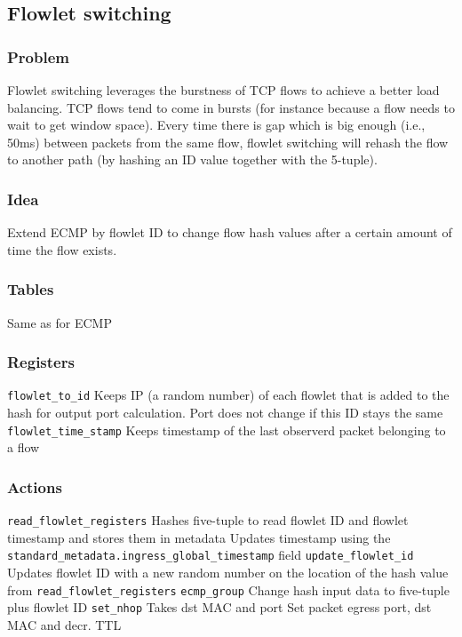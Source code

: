 \documentclass[a4paper, fontsize=8pt, landscape, DIV=1]{scrartcl}
\begin{document}
\begin{multicols*}{4}
  \subsection{Flowlet switching}
  \subsubsection{Problem} Flowlet switching leverages the burstness of TCP flows to achieve a better load balancing. 
  TCP flows tend to come in bursts (for instance because
  a flow needs to wait to get window space). Every time there is gap which is big enough (i.e., 50ms) 
  between packets from the same flow, flowlet switching
  will rehash the flow to another path (by hashing an ID value together with the 5-tuple).

  \subsubsection{Idea} Extend ECMP by flowlet ID to change flow hash values after
  a certain amount of time the flow exists.

  \subsubsection{Tables} 
  Same as for ECMP

  \subsubsection{Registers}
  \begin{outline}
  \1 \texttt{flowlet\_to\_id}
    \2 Keeps IP (a random number) of each flowlet that is added to the hash
    for output port calculation. Port does not change if this ID stays the same
  \1 \texttt{flowlet\_time\_stamp}
    \2 Keeps timestamp of the last observerd packet belonging to a flow
  \end{outline}

  \subsubsection{Actions}
  \begin{outline}
  \1 \texttt{read\_flowlet\_registers}
    \2 Hashes five-tuple to read flowlet ID and flowlet timestamp and stores them
    in metadata
    \2 Updates timestamp using the \texttt{standard\_metadata.ingress\_global\_timestamp} field
  \1 \texttt{update\_flowlet\_id}
    \2 Updates flowlet ID with a new random number on the location of the hash value from 
    \texttt{read\_flowlet\_registers}
  \1 \texttt{ecmp\_group}
    \2 Change hash input data to five-tuple plus flowlet ID
  \1 \texttt{set\_nhop} Takes dst MAC and port
    \2 Set packet egress port, dst MAC and decr. TTL
  \end{outline}


\end{multicols*}
\end{document}
